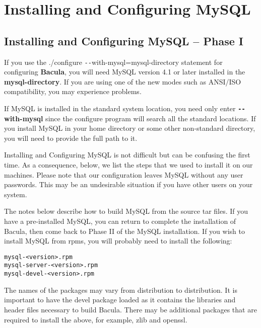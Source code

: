 
\chapter{Installing and Configuring MySQL}
\label{MySqlChapter}

\section{Installing and Configuring MySQL -- Phase I}

If you use the ./configure \verb:--:with-mysql=mysql-directory statement for
configuring {\bf Bacula}, you will need MySQL version 4.1 or later installed
in the {\bf mysql-directory}.  If you are using one of the new modes such as
ANSI/ISO compatibility, you may experience problems.

If MySQL is installed in the standard system location, you need only enter
{\bf \verb:--:with-mysql} since the configure program will search all the
standard locations.  If you install MySQL in your home directory or some
other non-standard directory, you will need to provide the full path to it.

Installing and Configuring MySQL is not difficult but can be confusing the
first time. As a consequence, below, we list the steps that we used to install
it on our machines. Please note that our configuration leaves MySQL without
any user passwords. This may be an undesirable situation if you have other
users on your system. 

The notes below describe how to build MySQL from the source tar files. If
you have a pre-installed MySQL, you can return to complete the installation
of Bacula, then come back to Phase II of the MySQL installation.  If you
wish to install MySQL from rpms, you will probably need to install
the following:

\footnotesize
\begin{verbatim}
mysql-<version>.rpm
mysql-server-<version>.rpm
mysql-devel-<version>.rpm
\end{verbatim}
\normalsize
The names of the packages may vary from distribution to
distribution. It is important to have the devel package loaded as
it contains the libraries and header files necessary to build
Bacula.  There may be additional packages that are required to 
install the above, for example, zlib and openssl.   

